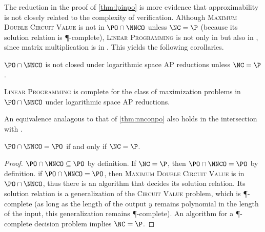 \documentclass[]{article}
\begin{document}

The reduction in the proof of \autoref{thm:lpinpo} is more evidence that approximability is not closely related to the complexity of verification.
Although \textsc{Maximum Double Circuit Value} is not in $\PO \cap \NNCO$ unless $\NC = \P$ (because its solution relation is \P-complete), \textsc{Linear Programming} is not only in \PO{} but also in \NNCO, since matrix multiplication is in \NC.
This yields the following corollaries.

\begin{corollary}
  $\PO \cap \NNCO$ is not closed under logarithmic space AP reductions unless $\NC = \P$.
\end{corollary}

\begin{corollary}\label{cor:lpishard}
  \textsc{Linear Programming} is complete for the class of maximization problems in $\PO \cap \NNCO$ under logarithmic space AP reductions.
\end{corollary}

An equivalence analagous to that of \autoref{thm:nnconpo} also holds in the intersection with \PO.

\begin{theorem}\label{thm:poppo}
  $\PO \cap \NNCO = \PO$ if and only if $\NC = \P$.
\end{theorem}
\begin{proof}
  $\PO \cap \NNCO \subseteq \PO$ by definition.
  If $\NC = \P$, then $\PO \cap \NNCO = \PO$ by definition.
  if $\PO \cap \NNCO = \PO$, then \textsc{Maximum Double Circuit Value} is in $\PO \cap \NNCO$, thus there is an \NC{} algorithm that decides its solution relation.
  Its solution relation is a generalization of the \textsc{Circuit Value} problem, which is \P-complete (as long as the length of the output $y$ remains polynomial in the length of the input, this generalization remains \P-complete).
  An \NC{} algorithm for a \P-complete decision problem implies $\NC = \P$.
\end{proof}
\end{document}
